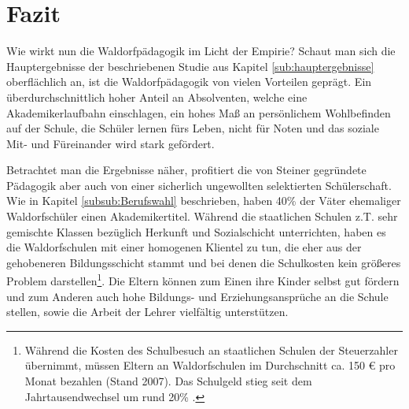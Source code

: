 \section{Fazit}


Wie wirkt nun die Waldorfpädagogik im Licht der Empirie? Schaut man sich die Hauptergebnisse der beschriebenen Studie aus Kapitel \ref{sub:hauptergebnisse} oberflächlich an, ist die Waldorfpädagogik von vielen Vorteilen geprägt. Ein überdurchschnittlich hoher Anteil an Absolventen, welche eine Akademikerlaufbahn einschlagen, ein hohes Maß an persönlichem Wohlbefinden auf der Schule, die Schüler lernen fürs Leben, nicht für Noten und das soziale Mit- und Füreinander wird stark gefördert. %

Betrachtet man die Ergebnisse näher, profitiert die von Steiner gegründete Pädagogik aber auch von einer sicherlich ungewollten selektierten Schülerschaft. Wie in Kapitel \ref{subsub:Berufswahl} beschrieben, haben 40\% der Väter ehemaliger Waldorfschüler einen Akademikertitel. Während die staatlichen Schulen z.T. sehr gemischte Klassen bezüglich Herkunft und Sozialschicht unterrichten, haben es die Waldorfschulen mit einer homogenen Klientel zu tun, die eher aus der gehobeneren Bildungsschicht stammt und bei denen die Schulkosten kein größeres Problem darstellen\footnote{Während die Kosten des Schulbesuch an staatlichen Schulen der Steuerzahler übernimmt, müssen Eltern an Waldorfschulen im Durchschnitt ca. 150 € pro Monat bezahlen (Stand 2007). Das Schulgeld stieg seit dem Jahrtausendwechsel um rund 20\% \citep[vgl.][]{mannheim09}.}. Die Eltern können zum Einen ihre Kinder selbst gut fördern und zum Anderen auch hohe Bildungs- und Erziehungsansprüche an die Schule stellen, sowie die Arbeit der Lehrer vielfältig unterstützen. %

